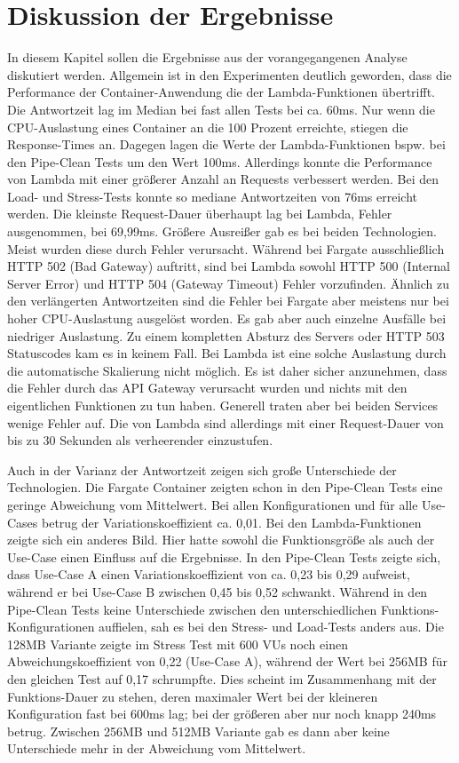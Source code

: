 \chapter{Diskussion der Ergebnisse}
In diesem Kapitel sollen die Ergebnisse aus der vorangegangenen Analyse diskutiert werden.
Allgemein ist in den Experimenten deutlich geworden, dass die Performance der Container-Anwendung die der Lambda-Funktionen übertrifft. Die Antwortzeit lag im Median bei fast allen Tests bei ca. 60ms. Nur wenn die CPU-Auslastung eines Container an die 100 Prozent erreichte, stiegen die Response-Times an. Dagegen lagen die Werte der Lambda-Funktionen bspw. bei den Pipe-Clean Tests um den Wert 100ms. Allerdings konnte die Performance von Lambda mit einer größerer Anzahl an Requests verbessert werden. Bei den Load- und Stress-Tests konnte so mediane Antwortzeiten von 76ms erreicht werden. Die kleinste Request-Dauer überhaupt lag bei Lambda, Fehler ausgenommen, bei 69,99ms. Größere Ausreißer gab es bei beiden Technologien. Meist wurden diese durch Fehler verursacht. Während bei Fargate ausschließlich HTTP 502 (Bad Gateway) auftritt, sind bei Lambda sowohl HTTP 500 (Internal Server Error) und HTTP 504 (Gateway Timeout) Fehler vorzufinden. Ähnlich zu den verlängerten Antwortzeiten sind die Fehler bei Fargate aber meistens nur bei hoher CPU-Auslastung ausgelöst worden. Es gab aber auch einzelne Ausfälle bei niedriger Auslastung. Zu einem kompletten Absturz des Servers oder HTTP 503 Statuscodes kam es in keinem Fall. 
Bei Lambda ist eine solche Auslastung durch die automatische Skalierung nicht möglich. Es ist daher sicher anzunehmen, dass die Fehler durch das API Gateway verursacht wurden und nichts mit den eigentlichen Funktionen zu tun haben. Generell traten aber bei beiden Services wenige Fehler auf. Die von Lambda sind allerdings mit einer Request-Dauer von bis zu 30 Sekunden als verheerender einzustufen.

Auch in der Varianz der Antwortzeit zeigen sich große Unterschiede der Technologien. Die Fargate Container zeigten schon in den Pipe-Clean Tests eine geringe Abweichung vom Mittelwert. Bei allen Konfigurationen und für alle Use-Cases betrug der Variationskoeffizient ca. 0,01. Bei den Lambda-Funktionen zeigte sich ein anderes Bild. Hier hatte sowohl die Funktionsgröße als auch der Use-Case einen Einfluss auf die Ergebnisse. In den Pipe-Clean Tests zeigte sich, dass Use-Case A einen Variationskoeffizient von ca. 0,23 bis 0,29 aufweist, während er bei Use-Case B zwischen 0,45 bis 0,52 schwankt. Während in den Pipe-Clean Tests keine Unterschiede zwischen den unterschiedlichen Funktions-Konfigurationen auffielen, sah es bei den Stress- und Load-Tests anders aus. Die 128MB Variante zeigte im Stress Test mit 600 VUs noch einen Abweichungskoeffizient von 0,22 (Use-Case A), während der Wert bei 256MB für den gleichen Test auf 0,17 schrumpfte. Dies scheint im Zusammenhang mit der Funktions-Dauer zu stehen, deren maximaler Wert bei der kleineren Konfiguration fast bei 600ms lag; bei der größeren aber nur noch knapp 240ms betrug. Zwischen 256MB und 512MB Variante gab es dann aber keine Unterschiede mehr in der Abweichung vom Mittelwert.

